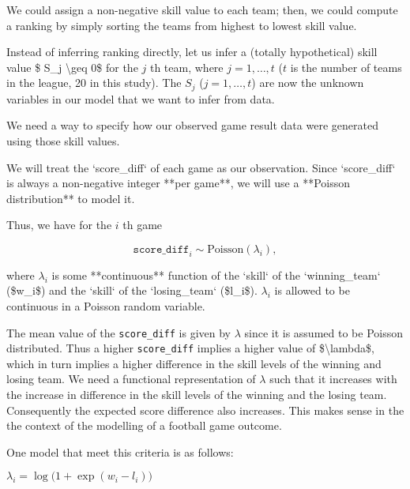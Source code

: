 \documentclass[
]{article}
\begin{document}
We could assign a non-negative skill value to each team; then, we could
compute a ranking by simply sorting the teams from highest to lowest
skill value.

Instead of inferring ranking directly, let us infer a (totally
hypothetical) skill value \$ S\_j \textbackslash geq 0\$ for the \(j\)
th team, where \(j = 1, \dots, t\) (\(t\) is the number of teams in the
league, 20 in this study). The \(S_j\) (\(j = 1, \dots, t\)) are now the
unknown variables in our model that we want to infer from data.

We need a way to specify how our observed game result data were
generated using those skill values.

We will treat the `score\_diff` of each game as our observation. Since
`score\_diff` is always a non-negative integer **per game**, we will use
a **Poisson distribution** to model it.

Thus, we have for the \(i\) th game

\[\texttt{score_diff}_i \sim \text{Poisson}(\lambda_i),\]

where \(\lambda_i\) is some **continuous** function of the `skill` of
the `winning\_team` (\$w\_i\$) and the `skill` of the `losing\_team`
(\$l\_i\$). \(\lambda_i\) is allowed to be continuous in a Poisson
random variable.

The mean value of the \texttt{score\_diff} is given by \(\lambda\) since
it is assumed to be Poisson distributed. Thus a higher
\texttt{score\_diff} implies a higher value of
\$\textbackslash lambda\$, which in turn implies a higher difference in
the skill levels of the winning and losing team. We need a functional
representation of \(\lambda\) such that it increases with the increase
in difference in the skill levels of the winning and the losing team.
Consequently the expected score difference also increases. This makes
sense in the the context of the modelling of a football game outcome.

One model that meet this criteria is as follows:

\(\lambda_i = \log\big(1 + \exp(w_i - l_i)\big)\)
\end{document}
